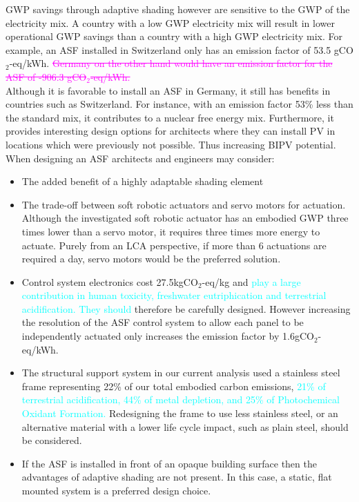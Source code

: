 GWP savings through adaptive shading however are sensitive to the GWP of the electricity mix. A country with a low GWP electricity mix will result in lower operational GWP savings than a country with a high GWP electricity mix. For example, an ASF installed in Switzerland only has an emission factor of 53.5 gCO$_{2}$-eq/kWh. \textcolor{magenta}{\sout{Germany on the other hand would have an emission factor for the ASF of -906.3  gCO$_{2}$-eq/kWh.}}\\

Although it is favorable to install an ASF in Germany, it still has benefits in countries such as Switzerland. For instance, with an emission factor 53\% less than the standard mix, it contributes to a nuclear free energy mix. Furthermore, it provides interesting design options for architects where they can install PV in locations which were previously not possible. Thus increasing BIPV potential.  \\

When designing an ASF architects and engineers may consider: 
\begin{itemize}
\item The added benefit of a highly adaptable shading element
\item The trade-off between soft robotic actuators and servo motors for actuation. Although the investigated soft robotic actuator has an embodied GWP three times lower than a servo motor, it requires three times more energy to actuate. Purely from an LCA perspective, if more than 6 actuations are required a day, servo motors would be the preferred solution. 
\item Control system electronics cost 27.5kgCO$_{2}$-eq/kg and \textcolor{cyan}{play a large contribution in human toxicity, freshwater eutriphication and terrestrial acidification. They should} therefore be carefully designed. However increasing the resolution of the ASF control system to allow each panel to be independently actuated only increases the emission factor by 1.6gCO$_{2}$-eq/kWh.
\item The structural support system in our current analysis used a stainless steel frame representing 22\% of our total embodied carbon emissions, \textcolor{cyan}{21\% of terrestrial acidification, 44\% of metal depletion, and 25\% of Photochemical Oxidant Formation.} Redesigning the frame to use less stainless steel, or an alternative material with a lower life cycle impact, such as plain steel, should be considered.
\item If the ASF is installed in front of an opaque building surface then the advantages of adaptive shading are not present. In this case, a static, flat mounted system is a preferred design choice. 
\end{itemize}

